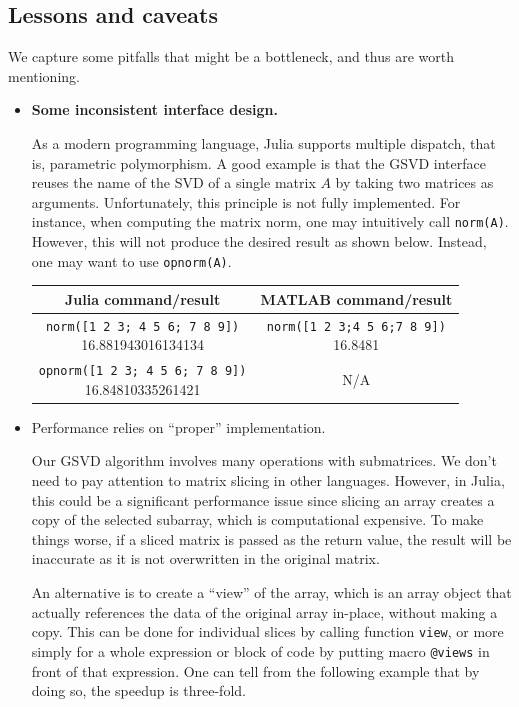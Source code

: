 \subsection{Lessons and caveats} 
We capture some pitfalls that might be a bottleneck, 
and thus are worth mentioning.
\begin{itemize} 

\item {\bf Some inconsistent interface design.}

As a modern programming language, Julia supports multiple dispatch, that is, parametric polymorphism. A good example is that the GSVD interface reuses the name of the SVD of a single matrix $A$ by taking two matrices as arguments. Unfortunately, this principle is not fully implemented. For instance, when computing the matrix norm, one may intuitively call \texttt{norm(A)}. However, this will not produce the desired result as shown below. Instead, one may want to use \texttt{opnorm(A)}. 

\begin{table}[H]
\centering
\begin{tabular}{|| c | c ||} \hline
Julia command/result & MATLAB command/result\\ [0.5ex] \hline\hline
\makecell{\texttt{norm([1 2 3; 4 5 6; 7 8 9])} \\
16.881943016134134} & \makecell{\texttt{norm([1 2 3;4 5 6;7 8 9])} \\ 16.8481} \\
\hline\hline
\makecell{\texttt{opnorm([1 2 3; 4 5 6; 7 8 9])} \\
16.84810335261421} & N/A \\
\hline\hline
\end{tabular}
\label{norm-api}
\end{table}

\item {Performance relies on ``proper'' implementation.}

Our GSVD algorithm involves many operations with submatrices. We don't need to pay attention to matrix slicing in other languages. However, in Julia, this could be a significant performance issue since slicing an array creates a copy of the selected subarray, which is computational expensive.  
To make things worse, if a sliced matrix is passed as the return value, the result will be inaccurate as it is not overwritten in the original matrix. 

An alternative is to create a ``view'' of the array, which is an array object that actually references the data of the original array in-place, without making a copy. This can be done for individual slices by calling function \texttt{view}, or more simply for a whole expression or block of code by putting macro \texttt{@views} in front of that expression. One can tell from the following example that by doing so, the speedup is three-fold. 


\end{itemize}
